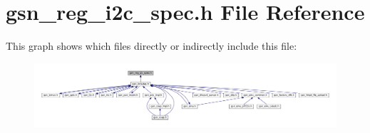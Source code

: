 \hypertarget{a00558}{
\section{gsn\_\-reg\_\-i2c\_\-spec.h File Reference}
\label{a00558}
}
This graph shows which files directly or indirectly include this file:
\nopagebreak
\begin{figure}[H]
\begin{center}
\leavevmode
\includegraphics[width=400pt]{a00794}
\end{center}
\end{figure}
